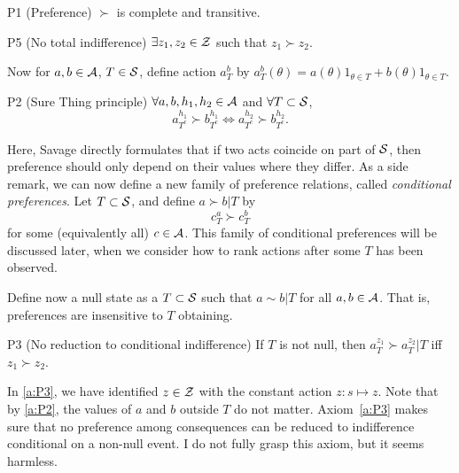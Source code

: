 \begin{axiom}{P1 (Preference)}\label{a:P1}
$\succ$ is complete and transitive.
\end{axiom}

\begin{axiom}{P5 (No total indifference)}\label{a:P5}
$\exists z_1,z_2\in\mathcal{Z}$ such that $z_1\succ z_2$.
\end{axiom}

Now for $a,b\in\mathcal{A}$, $T\in\mathcal{S}$, define action $a_{T}^b$ by $a_{T}^b(\theta) = a(\theta)1_{\theta\in T} + b(\theta)1_{\theta\in T}$.

\begin{axiom}{P2 (Sure Thing principle)}\label{a:P2}
$\forall a,b,h_1,h_2\in\mathcal{A}$ and $\forall T\subset\mathcal{S}$,
$$ a_{T^c}^{h_1} \succ b_{T^c}^{h_1} \Leftrightarrow a_{T^c}^{h_2} \succ b_{T^c}^{h_2}.$$
\end{axiom}
Here, Savage directly formulates that if two acts coincide on part of $\mathcal{S}$, then preference should only depend on their values where they differ. As a side remark, we can now define a new family of preference relations, called \emph{conditional preferences}.
Let $T\subset\mathcal{S}$, and define $a\succ b\vert T$ by
\begin{equation}
c_{T}^a \succ c_T^b
\label{e:conditionalPreference}
\end{equation}
for some (equivalently all) $c\in \mathcal{A}$. 
This family of conditional preferences will be discussed later, when we consider how to rank actions after some $T$ has been observed.

Define now a null state as a $T\subset\mathcal{S}$ such that $a\sim b\vert T$ for all $a,b\in\mathcal{A}$. That is, preferences are insensitive to $T$ obtaining.
\begin{axiom}{P3 (No reduction to conditional indifference)}\label{a:P3}
If $T$ is not null, then $a_{T}^{z_1}\succ a_T^{z_2}\vert T$ iff $z_1\succ z_2$.
\end{axiom}
In \ref{a:P3}, we have identified $z\in\mathcal{Z}$ with the constant action $z:s\mapsto z$. Note that by \ref{a:P2}, the values of $a$ and $b$ outside $T$ do not matter. Axiom~\ref{a:P3} makes sure that no preference among consequences can be reduced to indifference conditional on a non-null event. I do not fully grasp this axiom, but it seems harmless.

